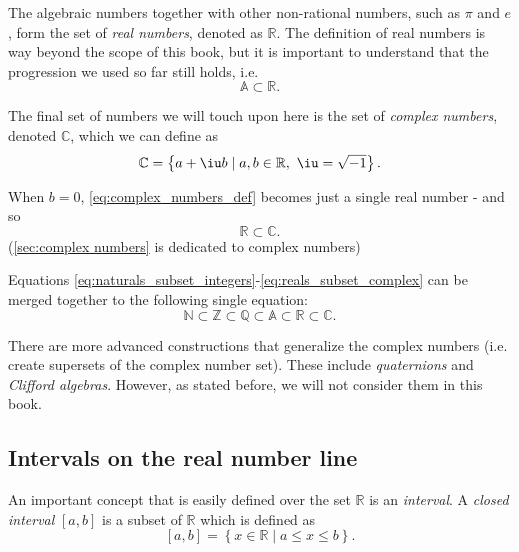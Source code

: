 The algebraic numbers together with other non-rational numbers, such as $\pi$ and $e$, form the set of \emph{real numbers}, denoted as $\mathbb{R}$. The definition of real numbers is way beyond the scope of this book, but it is important to understand that the progression we used so far still holds, i.e.
\begin{equation}
	\mathbb{A}\subset\mathbb{R}.
	\label{eq:algebraic_subset_reals}
\end{equation}

The final set of numbers we will touch upon here is the set of \emph{complex numbers}, denoted $\mathbb{C}$, which we can define as
\begin{equation}
	\mathbb{C} = \left\{ a+\iu b \mid a,b\in\mathbb{R},\ \iu=\sqrt{-1} \right\}.
	\label{eq:complex_numbers_def}
\end{equation}

When $b=0$, \autoref{eq:complex_numbers_def} becomes just a single real number - and so
\begin{equation}
	\mathbb{R}\subset\mathbb{C}.
	\label{eq:reals_subset_complex}
\end{equation}
(\autoref{sec:complex numbers} is dedicated to complex numbers)

Equations \ref{eq:naturals_subset_integers}-\ref{eq:reals_subset_complex} can be merged together to the following single equation:
\begin{equation}
	\mathbb{N} \subset \mathbb{Z} \subset \mathbb{Q} \subset \mathbb{A} \subset \mathbb{R} \subset \mathbb{C}.
	\label{eq:numbers_subsets}
\end{equation}

There are more advanced constructions that generalize the complex numbers (i.e. create supersets of the complex number set). These include \emph{quaternions} and \emph{Clifford algebras}. However, as stated before, we will not consider them in this book.

\subsection{Intervals on the real number line}
An important concept that is easily defined over the set $\mathbb{R}$ is an \emph{interval}. A \emph{closed interval} $\left[ a,b \right]$ is a subset of $\mathbb{R}$ which is defined as
\begin{equation}
	\left[ a,b \right] = \left\{ x\in\mathbb{R} \mid a\leq x\leq b \right\}.
	\label{eq:closed_interval}
\end{equation}

